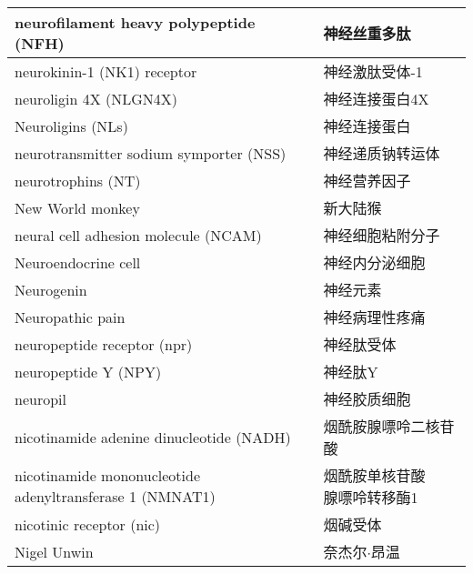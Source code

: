 \begin{longtable}{lll}
	\midrule
	neurofilament heavy polypeptide (NFH)   &&  神经丝重多肽 \\
	
	\midrule
	neurokinin-1 (NK1) receptor   && 神经激肽受体-1 \\
	
	\midrule
	neuroligin 4X (NLGN4X)  && 神经连接蛋白4X \\
	
	\midrule
	Neuroligins (NLs)   && 神经连接蛋白 \\
	
	\midrule
	neurotransmitter sodium symporter (NSS)  && 神经递质钠转运体 \\
	
	\midrule
	neurotrophins (NT)   && 神经营养因子 \\
	
	\midrule
	New World monkey   && 新大陆猴 \\
	
	\midrule
	neural cell adhesion molecule (NCAM)  && 神经细胞粘附分子 \\
	
	\midrule
	Neuroendocrine cell   && 神经内分泌细胞 \\
	
	\midrule
	Neurogenin   && 神经元素 \\
	
	\midrule
	Neuropathic pain   && 神经病理性疼痛 \\
	
	\midrule
	neuropeptide receptor (npr)   && 神经肽受体 \\
	
	\midrule
	neuropeptide Y (NPY)  && 神经肽Y \\
	
	\midrule
	neuropil  && 神经胶质细胞 \\
	
	\midrule
	nicotinamide adenine dinucleotide (NADH)  && 烟酰胺腺嘌呤二核苷酸 \\
	
	\midrule
	\makecell[l]{nicotinamide mononucleotide \\ adenyltransferase 1 (NMNAT1)}  && \makecell[l]{烟酰胺单核苷酸\\腺嘌呤转移酶1} \\
	
	\midrule
	nicotinic receptor (nic)  && 烟碱受体 \\
	
	\midrule
	Nigel Unwin   && 奈杰尔$\cdot$昂温 \\
	

\end{longtable}
